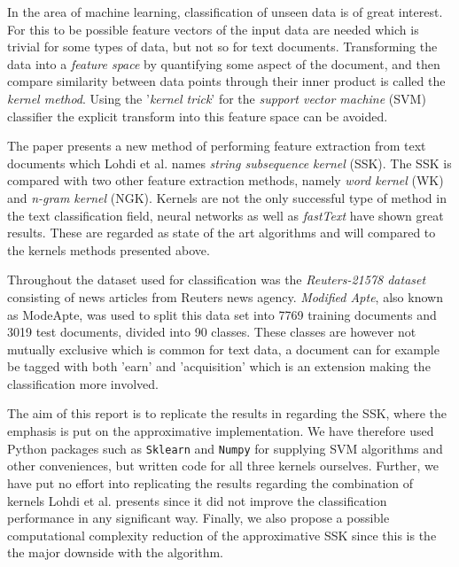 
In the area of machine learning, classification of unseen data is of great interest. For this to be possible feature vectors of the input data are needed which is trivial for some types of data, but not so for text documents. Transforming the data into a \textit{feature space} by quantifying some aspect of the document, and then compare similarity between data points through their inner product is called the \textit{kernel method}. Using the '\textit{kernel trick}' for the \textit{support vector machine} (SVM) classifier the explicit transform into this feature space can be avoided.%

The paper \cite{lodhi} presents a new method of performing feature extraction from text documents which Lohdi et al. names \textit{string subsequence kernel} (SSK). The SSK is compared with two other feature extraction methods, namely \textit{word kernel} (WK) and \textit{n-gram kernel} (NGK). Kernels are not the only successful type of method in the text classification field, neural networks as well as \textit{fastText} \cite{joulin2016bag} have shown great results. These are regarded as state of the art algorithms and will compared to the kernels methods presented above. 

Throughout \cite{lodhi} the dataset used for classification was the \textit{Reuters-21578 dataset} consisting of news articles from Reuters news agency. \textit{Modified Apte}, also known as ModeApte, was used to split this data set into 7769 training documents and 3019 test documents, divided into 90 classes. These classes are however not mutually exclusive which is common for text data, a document can for example be tagged with both 'earn' and 'acquisition' which is an extension making the classification more involved.

The aim of this report is to replicate the results in \cite{lodhi} regarding the SSK, where the emphasis is put on the approximative implementation. We have therefore used Python packages such as \texttt{Sklearn} and \texttt{Numpy} for supplying SVM algorithms and other conveniences, but written code for all three kernels ourselves. Further, we have put no effort into replicating the results regarding the combination of kernels Lohdi et al. presents since it did not improve the classification performance in any significant way. Finally, we also propose a possible computational complexity reduction of the approximative SSK since this is the the major downside with the algorithm.

